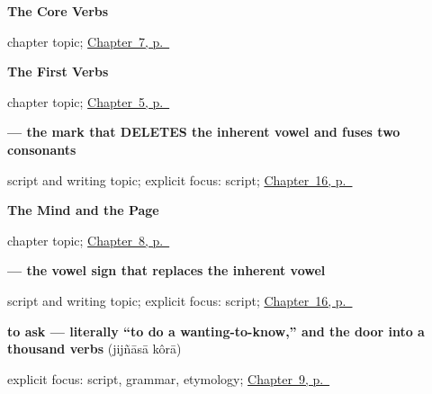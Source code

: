 \noindent\begin{minipage}[t]{\linewidth}
\raggedright
\textbf{The Core Verbs}\par
\footnotesize chapter topic; \hyperref[ch:bn-core-verbs]{Chapter~7, p.~\pageref*{ch:bn-core-verbs}}
\end{minipage}\par\smallskip

\noindent\begin{minipage}[t]{\linewidth}
\raggedright
\textbf{The First Verbs}\par
\footnotesize chapter topic; \hyperref[ch:first-verbs]{Chapter~5, p.~\pageref*{ch:first-verbs}}
\end{minipage}\par\smallskip

\noindent\begin{minipage}[t]{\linewidth}
\raggedright
\textbf{ — the mark that DELETES the inherent vowel and fuses two consonants}\par
\footnotesize script and writing topic; explicit focus: script; \hyperref[ch:bn-script-first]{Chapter~16, p.~\pageref*{ch:bn-script-first}}
\end{minipage}\par\smallskip

\noindent\begin{minipage}[t]{\linewidth}
\raggedright
\textbf{The Mind and the Page}\par
\footnotesize chapter topic; \hyperref[ch:bn-mind-and-page]{Chapter~8, p.~\pageref*{ch:bn-mind-and-page}}
\end{minipage}\par\smallskip

\noindent\begin{minipage}[t]{\linewidth}
\raggedright
\textbf{ — the vowel sign that replaces the inherent vowel}\par
\footnotesize script and writing topic; explicit focus: script; \hyperref[ch:bn-script-first]{Chapter~16, p.~\pageref*{ch:bn-script-first}}
\end{minipage}\par\smallskip

\noindent\begin{minipage}[t]{\linewidth}
\raggedright
\textbf{to ask — literally \textquotedblleft{}to do a wanting-to-know,\textquotedblright{} and the door into a thousand verbs}\enspace\emph{ }\enspace(jijñāsā kôrā)\par
\footnotesize explicit focus: script, grammar, etymology; \hyperref[ch:bn-conjunct-verbs]{Chapter~9, p.~\pageref*{ch:bn-conjunct-verbs}}
\end{minipage}\par\smallskip

